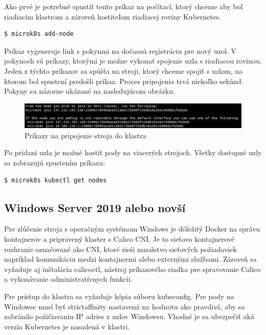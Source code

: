 Ako prvé je potrebné spustiť tento príkaz na počítací, ktorý chceme aby bol riadiacim klastrom a zároveň hostiteľom riadiacej roviny Kubernetes.

\begin{lstlisting}[language=Bash]
    $ microk8s add-node
    \end{lstlisting}

Príkaz vygeneruje link s pokynmi na dočasnú registráciu pre nový uzol. V pokynoch sú príkazy, ktorými je možne vykonať spojenie uzla s riadiacou rovinou. Jeden z týchto príkazov sa spúšťa na stroji, ktorý chceme spojiť s uzlom, na ktorom bol spustení predošli príkaz. Proces pripojenia trvá niekoľko sekúnd. Pokyny su názorne ukázané na nasledujúcom obrázku.

\begin{figure}[!h]
    \centering
    \includegraphics[width=1\linewidth]{figures/addnode}
    \caption{Príkazy na pripojenie stroja do klastra}
\end{figure}


Po pridaní uzla je možné hostiť pody na viacerých strojoch. Všetky dostupné uzly sa zobrazujú spustením príkazu:

\begin{lstlisting}[language=Bash]
    $ microk8s kubectl get nodes
    \end{lstlisting}

\subsection*{Windows Server 2019 alebo novší}

Pre zlúčenie stroja s operačným systémom Windows je dôležitý Docker na správu kontajnerov a pripravený klaster s Calico CNI. Je to sieťovo kontajnerové rozhranie označované ako CNI, ktoré rieši množstvo sieťových požiadaviek napríklad komunikáciu medzi kontajnermi alebo externými službami. Zároveň sa vyžaduje aj inštalácia calicoctl, nástroj príkazového riadka pre spravovanie Calico a vykonávanie administratívnych funkcii.

Pre prístup do klastra sa vyžaduje kópia súboru kubeconfig. Pre pody na Windowse musí byť strictaffinity nastavená na hodnotu ako pravdivá, aby sa zabránilo požičiavaniu IP adries z uzlov Windowsu. Vhodné je sa ubezpečiť aká verzia Kubernetes je nasadená v klastri.

